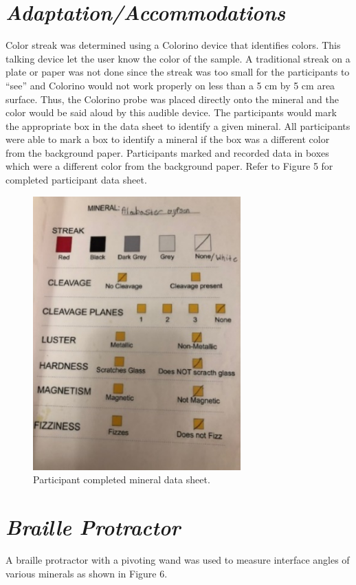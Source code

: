 \documentclass[11pt]{sig-alternate}
\begin{document}
\begin{large}
\section*{\textit{Adaptation/Accommodations}}
 Color streak was determined using a Colorino device that identifies colors. This talking device let the user know the color of the sample. A traditional streak on a plate or paper was not done since the streak was too small for the participants to “see” and Colorino would not work properly on less than a 5 cm by 5 cm area surface. Thus, the Colorino probe was placed directly onto the mineral and the color would be said aloud by this audible device. The participants would mark the appropriate box in the data sheet to identify a given mineral. All participants were able to mark a box to identify a mineral if the box was a different color from the background paper.  Participants marked and recorded data in boxes which were a different color from the background paper. Refer to Figure 5 for completed participant data sheet.
{\begin{figure}[htp] 
    \leftmargin
    \includegraphics[width=8cm]{figure5.png}
    \caption{Participant completed mineral data sheet.}
    \label{Participant completed mineral data sheet. }
\end{figure}
}
\section*{\textit{Braille Protractor}}
 
A braille protractor with a pivoting wand was used to measure interface angles of various minerals as shown in Figure 6. 


\end{large}
\end{document}
